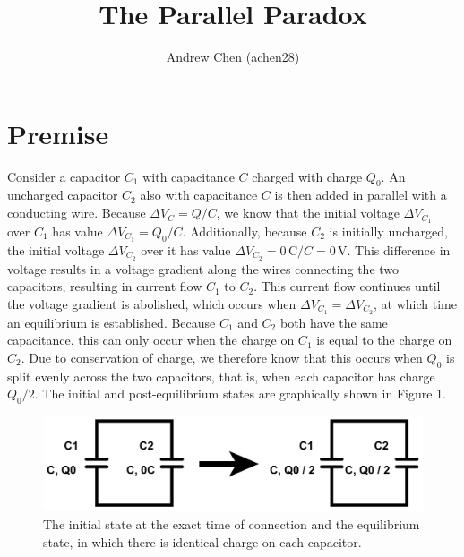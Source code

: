 \documentclass{article}
\title{The Parallel Paradox}
\author{Andrew Chen (achen28)}
\newcommand{\unit}[1]{\ensuremath{\, \mathrm{#1}}}
\begin{document}
\maketitle

\setlength{\abovedisplayskip}{1.5em}
\setlength{\belowdisplayskip}{1.5em}
\setlength{\abovedisplayshortskip}{1.5em}
\setlength{\belowdisplayshortskip}{1.5em} 
 

\section{Premise}

Consider a capacitor $C_1$ with capacitance $C$ charged with charge $Q_0$.  An uncharged capacitor $C_2$ also with capacitance $C$ is then added in parallel with a conducting wire.  Because $\Delta V_C = Q / C$, we know that the initial voltage $\Delta V_{C_1}$ over $C_1$ has value $\Delta V_{C_1} = Q_0 / C$.  Additionally, because $C_2$ is initially uncharged, the initial voltage $\Delta V_{C_2}$ over it has value $\Delta V_{C_2} = 0 \unit{C} / C = 0 \unit{V}$.  This difference in voltage results in a voltage gradient along the wires connecting the two capacitors, resulting in current flow $C_1$ to $C_2$.  This current flow continues until the voltage gradient is abolished, which occurs when $\Delta V_{C_1} = \Delta V_{C_2}$, at which time an equilibrium is established.  Because $C_1$ and $C_2$ both have the same capacitance, this can only occur when the charge on $C_1$ is equal to the charge on $C_2$.  Due to conservation of charge, we therefore know that this occurs when $Q_0$ is split evenly across the two capacitors, that is, when each capacitor has charge $Q_0 / 2$.  The initial and post-equilibrium states are graphically shown in Figure 1.

\begin{figure}[h!]
\centering
\includegraphics[scale=0.15]{1.jpg} 
\caption{The initial state at the exact time of connection and the equilibrium state, in which there is identical charge on each capacitor.}
\end{figure}
\end{document}
